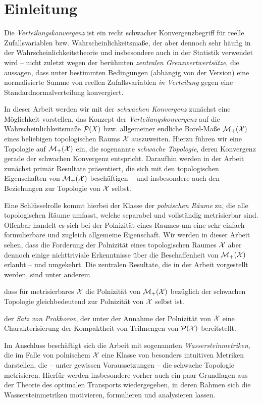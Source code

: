 \documentclass[../thesis/thesis.tex]{subfiles}
\begin{document}
	
	\chapter{Einleitung}
	
	Die \emph{Verteilungskonvergenz} ist ein recht schwacher Konvergenzbegriff für reelle Zufallsvariablen bzw. Wahrscheinlichkeitsmaße, der
	aber dennoch sehr häufig in der Wahrscheinlichkeitstheorie und insbesondere auch in der Statistik verwendet wird -- nicht zuletzt
	wegen der berühmten \emph{zentralen Grenzwertwertsätze}, die aussagen, dass unter bestimmten Bedingungen (abhängig von der Version)
	eine normalisierte Summe von reellen Zufallsvariablen \emph{in Verteilung} gegen eine Standardnormalverteilung konvergiert.
	
	In dieser Arbeit werden wir mit der \emph{schwachen Konvergenz} zunächst eine Möglichkeit vorstellen, das Konzept der \emph{Verteilungskonvergenz} 
	auf die Wahrscheinlichkeitsmaße $\mathcal{P}(X)$ bzw. allgemeiner endliche Borel-Maße $\mathcal{M}_{+}(\mathcal{X})$ eines 
	beliebigen topologischen Raums $\mathcal{X}$ auszuweiten. Hierzu führen wir eine Topologie
	auf $\mathcal{M}_{+}(\mathcal{X})$ ein, die sogenannte \emph{schwache Topologie}, deren Konvergenz gerade der schwachen Konvergenz entspricht.
	Daraufhin werden in der Arbeit zunächst primär Resultate präsentiert, die sich mit den topologischen Eigenschaften 
	von $\mathcal{M}_{+}(\mathcal{X})$ beschäftigen -- und insbesondere auch den Beziehungen zur Topologie von $\mathcal{X}$ selbst.
	
	Eine Schlüsselrolle kommt hierbei der Klasse der \emph{polnischen Räume} zu, die alle topologischen Räume umfasst, welche separabel und vollständig 
	metrisierbar sind. Offenbar handelt es sich bei der Polnizität eines Raumes um eine sehr einfach formulierbare und zugleich allgemeine Eigenschaft. 
	Wir werden in dieser Arbeit sehen, dass die Forderung der Polnizität 
	eines topologischen Raumes $\mathcal{X}$ aber dennoch einige nichttriviale Erkenntnisse über die Beschaffenheit von $\mathcal{M}_{+}(\mathcal{X})$ erlaubt -- und umgekehrt.
	Die zentralen Resultate, die in der Arbeit vorgestellt werden, sind unter anderem
	\begin{itemizethm}
		\item dass für metrisierbares $\mathcal{X}$ die Polnizität von $\mathcal{M}_{+}(\mathcal{X})$ bezüglich der schwachen Topologie
		gleichbedeutend zur Polnizität von $\mathcal{X}$ selbst ist.
		\item der \emph{Satz von Prokhorov}, der unter der Annahme der Polnizität von $\mathcal{X}$ eine Charakterisierung der Kompaktheit 
		von Teilmengen von $\mathcal{P}(\mathcal{X})$ bereitstellt.
	\end{itemizethm}
	Im Anschluss beschäftigt sich die Arbeit mit sogenannten \emph{Wassersteinmetriken}, die im Falle von polnischem $\mathcal{X}$ eine Klasse von 
	besonders intuitiven Metriken darstellen, die -- unter gewissen Voraussetzungen -- die schwache Topologie metrisieren. 
	Hierfür werden insbesondere vorher auch ein paar Grundlagen aus der Theorie des optimalen Transports wiedergegeben, in deren Rahmen sich 
	die Wassersteinmetriken motivieren, formulieren und analysieren lassen.
	
\end{document}
